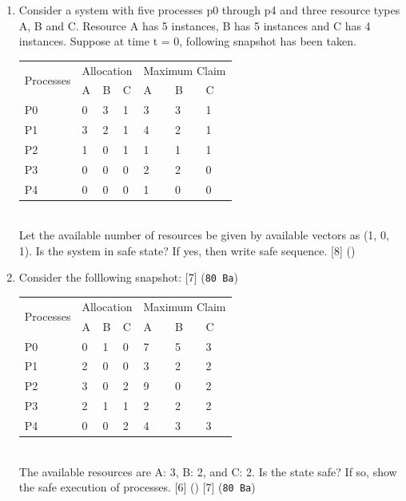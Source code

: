\documentclass[12pt]{article}
\begin{document}
\begin{enumerate}
			\item Consider a system with five processes p0 through p4 and three resource types A, B and C. Resource A has 5 instances, B has 5 instances and C has 4 instances. Suppose at time t = 0, following snapshot has been taken.\\
			\begin{tabular}{|p{17mm}|p{7mm}|p{7mm}|p{7mm}|p{7mm}|p{7mm}|p{7mm}|}
				\hline
				\multirow{2}{*}{Processes} & \multicolumn{3}{|c|}{Allocation} & \multicolumn{3}{|c|}{Maximum Claim} \\ \cline{2-7}
				& A & B & C & A & B & C \\ \hline
				P0 & 0 & 3 & 1 & 3 & 3 & 1 \\ \hline
				P1 & 3 & 2 & 1 & 4 & 2 & 1 \\ \hline
				P2 & 1 & 0 & 1 & 1 & 1 & 1 \\ \hline
				P3 & 0 & 0 & 0 & 2 & 2 & 0 \\ \hline
				P4 & 0 & 0 & 0 & 1 & 0 & 0 \\ \hline
			\end{tabular}\\
			Let the available number of resources be given by available vectors as (1, 0, 1). Is the system in safe state? If yes, then write safe sequence. \hfill [8] (\bo{80 Ch})

			\item Consider the folllowing snapshot: \hfill [7] (\texttt{80 Ba})\\
			\begin{tabular}{|p{17mm}|p{7mm}|p{7mm}|p{7mm}|p{7mm}|p{7mm}|p{7mm}|}
				\hline
				\multirow{2}{*}{Processes} & \multicolumn{3}{|c|}{Allocation} & \multicolumn{3}{|c|}{Maximum Claim} \\ \cline{2-7}
				& A & B & C & A & B & C \\ \hline
				P0 & 0 & 1 & 0 & 7 & 5 & 3 \\ \hline
				P1 & 2 & 0 & 0 & 3 & 2 & 2 \\ \hline
				P2 & 3 & 0 & 2 & 9 & 0 & 2 \\ \hline
				P3 & 2 & 1 & 1 & 2 & 2 & 2 \\ \hline
				P4 & 0 & 0 & 2 & 4 & 3 & 3 \\ \hline
			\end{tabular}\\
			The available resources are A: 3, B: 2, and C: 2. Is the state safe? If so, show the safe execution of processes. \hfill [6] () [7] (\texttt{80 Ba})


\end{enumerate}
\end{document}

